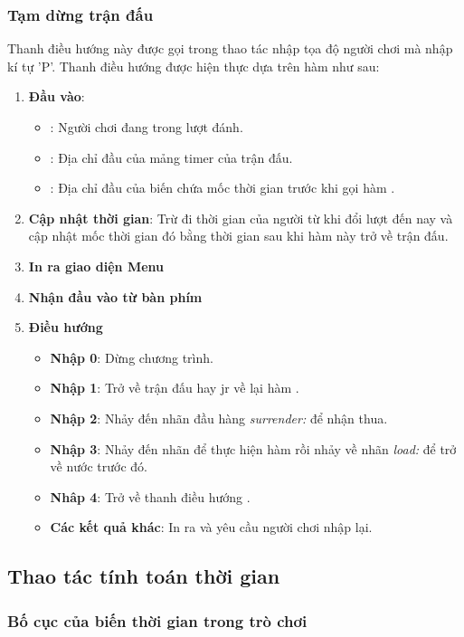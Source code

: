 \subsubsection{Tạm dừng trận đấu}
Thanh điều hướng này được gọi trong thao tác nhập tọa độ người chơi  mà nhập kí tự 'P'. Thanh điều hướng được hiện thực dựa trên hàm  như sau:
\begin{enumerate}
   \item \textbf{Đầu vào}: 
   \begin{itemize}
   \item {}: Người chơi đang trong lượt đánh.
   \item {}: Địa chỉ đầu của mảng timer của trận đấu.
   \item {}: Địa chỉ đầu của biến chứa mốc thời gian trước khi gọi hàm .
   \end{itemize}
   \item \textbf{Cập nhật thời gian}: Trừ đi thời gian của người từ khi đổi lượt đến nay và cập nhật mốc thời gian đó bằng thời gian sau khi hàm này trở về trận đấu.  
   \item \textbf{In ra giao diện Menu}
   \item \textbf{Nhận đầu vào từ bàn phím}
   \item \textbf{Điều hướng}
   \begin{itemize}
      \item \textbf{Nhập 0}: Dừng chương trình.
      \item \textbf{Nhập 1}: Trở về trận đấu hay jr  về lại hàm .
      \item \textbf{Nhập 2}: Nhảy đến nhãn đầu hàng \textit{surrender:} để nhận thua.
      \item \textbf{Nhập 3}: Nhảy đến nhãn để thực hiện hàm  rồi nhảy về nhãn \textit{load:} để trở về nước trước đó.
      \item \textbf{Nhâp 4}: Trở về thanh điều hướng .
      \item \textbf{Các kết quả khác}: In ra và yêu cầu người chơi nhập lại.
   \end{itemize}
\end{enumerate}

\subsection{Thao tác tính toán thời gian}
\subsubsection{Bố cục của biến thời gian trong trò chơi}


